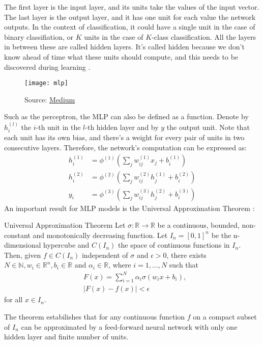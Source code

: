 The first layer is the input layer, and its units take the values of the input vector. The last layer is the output layer, and it has one unit for each value the network outputs. In the context of classification, it could have a single unit in the case of binary classifiation, or $K$ units in the case of $K$-class classification. All the layers in between these are called hidden layers. It's called hidden because we don't know ahead of time what these units should compute, and this needs to be discovered during learning \cite{grosse2021}.
\begin{figure}[H]
    \texttt{[image: mlp]}
    \caption{Source: \href{https://kinder-chen.medium.com/multilayer-perceptron-55bb39a08133}{Medium}}
\end{figure}
Such as the perceptron, the MLP can also be defined as a function. Denote by $h_i^{(l)}$ the $i$-th unit in the $l$-th hidden layer and by $y$ the output unit. Note that each unit has its own bias, and there's a weight for every pair of units in two consecutive layers. Therefore, the network's computation can be expressed as:
\begin{align}
    h_i^{(1)} &= \phi^{(1)} \left(\sum_j w_{ij}^{(1)}x_j + b_i^{(1)}\right) \nonumber \\
    h_i^{(2)} &= \phi^{(2)} \left(\sum_j w_{ij}^{(2)}h_j^{(1)} + b_i^{(2)}\right) \\
    y_i &= \phi^{(3)} \left(\sum_j w_{ij}^{(3)}h_j^{(2)} + b_i^{(3)}\right) \nonumber
\end{align}
An important result for MLP models is the Universal Approximation Theorem \cite{journals/mcss/Cybenko89}:
\begin{theorem}{Universal Approximation Theorem}
    Let $\sigma: \mathbb{R} \rightarrow \mathbb{R}$ be a continuous, bounded, non-constant and monotonically decreasing function. Let $I_{n}=[0,1]^{n}$ be the n-dimensional hypercube and $C\left(I_{n}\right)$ the space of continuous functions in $I_{n}$. Then, given $f \in C\left(I_{n}\right)$ independent of $\sigma$ and $\epsilon>0$, there exists $N \in \mathbb{N}, w_{i} \in \mathbb{R}^{n}, b_{i} \in \mathbb{R}$ and $\alpha_{i} \in \mathbb{R}$, where $i=1, \ldots, N$ such that 
    \[
    \begin{aligned}
    &F(x)=\sum_{i=1}^{N} \alpha_{i} \sigma(w_ix+b_i), \\
    &|F(x) - f(x)| < \epsilon
    \end{aligned}
    \]
    for all $x \in I_{n}$.
\end{theorem}
The theorem estabilishes that for any continuous function $f$ on a compact subset of $I_n$ can be approximated by a feed-forward neural network with only one hidden layer and finite number of units.

